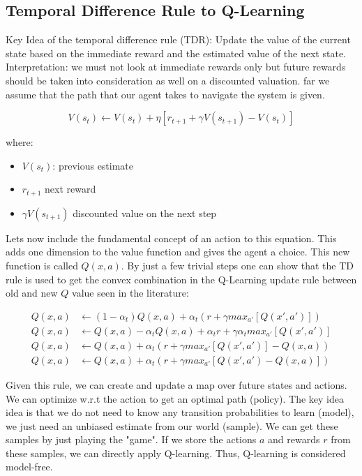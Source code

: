 \documentclass[main]{subfiles}
\begin{document}
\subsection{Temporal Difference Rule to Q-Learning}
Key Idea of the temporal difference rule (TDR): 
Update the value of the current state based on the immediate reward and the estimated value of the next state. 
Interpretation: we must not look at immediate rewards only but future rewards should be taken into consideration as well on a discounted valuation. 
far we assume that the path that our agent takes to navigate the system is given.


\begin{equation}
    V(s_{t}) \leftarrow V(s_t) + \eta[r_{t+1} + \gamma V(s_{t+1}) - V(s_t) ]
\end{equation}

where:

\begin{itemize}
    \item $V(s_t)$: previous estimate
    \item $r_{t+1}$ next reward
    \item $\gamma V(s_{t+1})$ discounted value on the next step
\end{itemize}

Lets now include the fundamental concept of an action to this equation. This adds one dimension to the value function and gives the agent a choice. This new function is called $Q(x,a)$. 
By just a few trivial steps one can show that the TD rule is used to get the convex combination in the Q-Learning update rule between old and new $Q$ value seen in the literature:

\begin{align}
Q(x,a)& \leftarrow (1-\alpha_t)Q(x,a) + \alpha_t(r+\gamma max_{a'}[Q(x',a')]) \\
Q(x,a)& \leftarrow Q(x,a) - \alpha_t Q(x,a)  + \alpha_t r + \gamma \alpha_t max_{a'}[Q(x',a')] \\
Q(x,a)& \leftarrow Q(x,a) + \alpha_t (r + \gamma max_{a'}[Q(x',a')] - Q(x,a)) \\
Q(x,a)& \leftarrow Q(x,a) + \alpha_t (r + \gamma max_{a'}[Q(x',a') - Q(x,a)])
\end{align}

Given this rule, we can create and update a map over future states and actions. We can optimize w.r.t the action to get an optimal path (policy). The key idea idea is that we do not need to know any transition probabilities to learn (model), we just need an unbiased estimate from our world (sample). We can get these samples by just playing the "game". If we store the actions $a$ and rewards $r$ from these samples, we can directly apply Q-learning. Thus, Q-learning is considered model-free.
\end{document}
